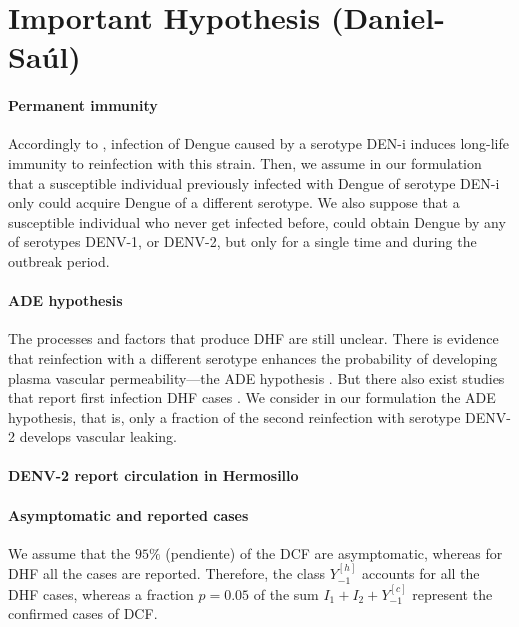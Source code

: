 \section*{Important Hypothesis (Daniel-Saúl)}
	\paragraph{Permanent immunity}
	Accordingly to \cite{WHO}, infection of Dengue caused by a serotype DEN-i
	induces long-life immunity to reinfection with this strain. Then, we
	assume in our formulation that a susceptible individual previously
	infected with Dengue of serotype DEN-i only could acquire Dengue of a 
	different serotype.  We also suppose that a susceptible individual who 
	never get infected before, could obtain Dengue by any of serotypes 
	DENV-1, or DENV-2, but only for a single time and during the outbreak 
	period.
%
	\paragraph{ADE hypothesis}
	The processes and factors that produce \ac{DHF} are still unclear. There is 
	evidence that reinfection with a different serotype enhances the probability 
	of developing plasma vascular permeability---the \ac{ADE} hypothesis 
	\citep[see, e.g.][p. 295]{Halstead1992}. 
	But there also exist studies that report first infection DHF cases 
	\cite{Debast1993}. We consider in our formulation the ADE hypothesis, that 
	is, only a fraction of the second reinfection with serotype \ac{DENV-2} 
	develops vascular leaking.
%
\paragraph{\ac{DENV-2} report circulation in Hermosillo}
\paragraph{Asymptomatic and reported cases}

We assume that the $95\%$ (pendiente) of the \ac{DCF} are asymptomatic, whereas for 
\ac{DHF}  all the cases are reported. Therefore, the class $Y_{-1}^{[h]}$ accounts for
all the \ac{DHF} cases, whereas a fraction $p=0.05$ of the sum $I_1+ I_2 + 
Y_{-1}^{[c]}$ represent the confirmed cases of \ac{DCF}.


